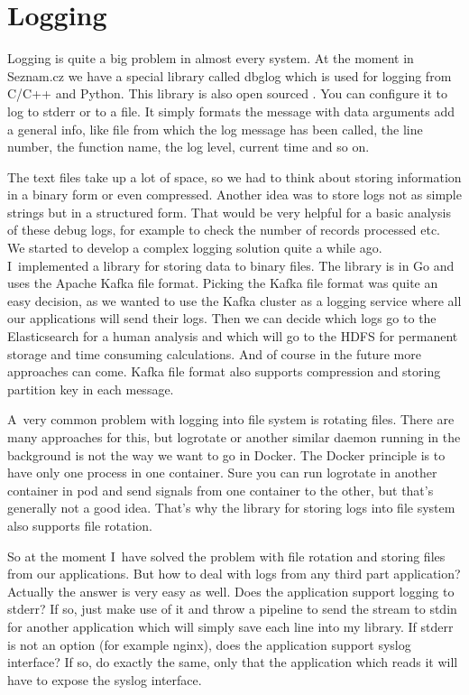 \chapter{Logging}

Logging is quite a big problem in almost every system. At the moment in Seznam.cz we have a special library called dbglog which is used for logging from C/C++ and Python. This library is also open sourced \cite{dbglog}. You can configure it to log to stderr or to a file. It simply formats the message with data arguments add a general info, like file from which the log message has been called, the line number, the function name, the log level, current time and so on.

The text files take up a lot of space, so we had to think about storing information in a binary form or even compressed. Another idea was to store logs not as simple strings but in a structured form. That would be very helpful for a basic analysis of these debug logs, for example to check the number of records processed etc. We started to develop a complex logging solution quite a while ago. I~implemented a library for storing data to binary files. The library is in Go and uses the Apache Kafka \cite{kafka} file format. Picking the Kafka file format was quite an easy decision, as we wanted to use the Kafka cluster as a logging service where all our applications will send their logs. Then we can decide which logs go to the Elasticsearch \cite{elasticsearch} for a human analysis and which will go to the HDFS \cite{hdfs} for permanent storage and time consuming calculations. And of course in the future more approaches can come. Kafka file format also supports compression and storing partition key in each message.

A~very common problem with logging into file system is rotating files. There are many approaches for this, but logrotate or another similar daemon running in the background is not the way we want to go in Docker. The Docker principle is to have only one process in one container. Sure you can run logrotate in another container in pod and send signals from one container to the other, but that’s generally not a good idea. That’s why the library for storing logs into file system also supports file rotation.

So at the moment I~have solved the problem with file rotation and storing files from our applications. But how to deal with logs from any third part application? Actually the answer is very easy as well. Does the application support logging to stderr? If so, just make use of it and throw a pipeline to send the stream to stdin for another application which will simply save each line into my library. If stderr is not an option (for example nginx), does the application support syslog interface? If so, do exactly the same, only that the application which reads it will have to expose the syslog interface.

